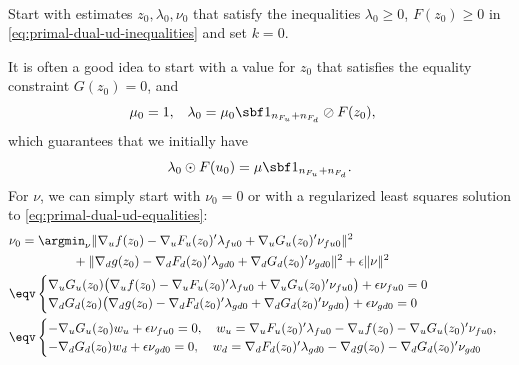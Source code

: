 \documentclass[11pt]{article}
\begin{document}
\begin{algorithm}~\label{al:primal-dual}
\begin{steps}
\item Start with estimates $z_0,\lambda_0,\nu_0$ that satisfy the inequalities
  $\lambda_0\ge 0$, $F(z_0)\ge 0$ in \eqref{eq:primal-dual-ud-inequalities} and set $k=0$.

  It is often a good idea to start with a value for $z_0$ that
  satisfies the equality constraint $G(z_0)=0$, and
  \begin{align*}
    \mu_0&=1, &
    \lambda_0&=\mu_0\sbf 1_{n_{F_u}+n_{F_d}}\oslash F(z_0),
  \end{align*}
  which guarantees that we initially have
  \begin{align*}
    \lambda_0\odot F(u_0)=\mu\sbf 1_{n_{F_u}+n_{F_d}}.
  \end{align*}
  For $\nu$, we can simply start with $\nu_0=0$ or with a regularized least
  squares solution to \eqref{eq:primal-dual-ud-equalities}:
  \begin{align*}
    &\nu_0=\argmin_\nu
    \|\nabla_u f(z_0)-\nabla_u F_u(z_0)'\lambda_{fu0}+\nabla_u G_u(z_0)'\nu_{fu0}\|^2
    \\&\hspace{5em}
    +\|\nabla_d g(z_0)-\nabla_d F_d(z_0)'\lambda_{gd0}+\nabla_d G_d(z_0)'\nu_{gd0}\|^2
    +\epsilon\|\nu\|^2\\
    &\eqv
    \begin{cases}
      \nabla_u G_u(z_0)\big(\nabla_u f(z_0)-\nabla_u F_u(z_0)'\lambda_{fu0}+\nabla_u G_u(z_0)'\nu_{fu0}\big)+\epsilon\nu_{fu0}=0\\
      \nabla_d G_d(z_0)\big(\nabla_d g(z_0)-\nabla_d F_d(z_0)'\lambda_{gd0}+\nabla_d G_d(z_0)'\nu_{gd0}\big)+\epsilon\nu_{gd0}=0
    \end{cases}\\
    &\eqv
    \begin{cases}
      -\nabla_u G_u(z_0)w_u+\epsilon\nu_{fu0}=0, \quad
      w_u=\nabla_u F_u(z_0)'\lambda_{fu0}-\nabla_u f(z_0)-\nabla_u G_u(z_0)'\nu_{fu0},\\
      -\nabla_d G_d(z_0)w_d+\epsilon\nu_{gd0}=0, \quad
      w_d=\nabla_d F_d(z_0)'\lambda_{gd0}-\nabla_d g(z_0)-\nabla_d G_d(z_0)'\nu_{gd0}
    \end{cases}\\

\end{align*}
\end{steps}
\end{algorithm}
\end{document}
